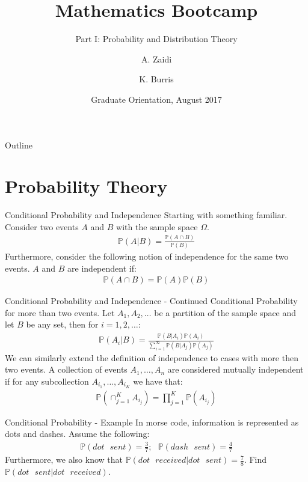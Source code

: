 \documentclass{beamer}
\title{Mathematics Bootcamp}
\subtitle{Part I: Probability and Distribution Theory}
\author{A. Zaidi\inst{1} \and K. Burris\inst{1}}
\institute[Duke University] %
{
  \inst{1}%
  Department of Statistical Science\\
  Duke University
  }
\date{Graduate Orientation, August 2017}
\begin{document}
\begin{frame}
  \titlepage
\end{frame}

\begin{frame}{Outline}
  \tableofcontents
\end{frame}

\section{Probability Theory}
\begin{frame}{Conditional Probability and Independence}
Starting with something familiar. Consider two events $A$ and $B$ with the sample space $\Omega$. 
\begin{align*}
\mathbb{P}(A|B) = \frac{\mathbb{P}(A \cap B)}{\mathbb{P}(B)}
\end{align*}
Furthermore, consider the following notion of independence for the same two events. $A$ and $B$ are independent if:
\begin{align*}
\mathbb{P}(A \cap B) = \mathbb{P}(A)\mathbb{P}(B)
\end{align*}
\end{frame}

\begin{frame}{Conditional Probability and Independence - Continued}
Conditional Probability for more than two events. Let $A_{1}, A_{2},\ldots$ be a partition of the sample space and let $B$ be any set, then for $i = 1, 2, \ldots$:
\begin{align*}
\mathbb{P}(A_{i}|B) = \frac{\mathbb{P}(B|A_{i})\mathbb{P}(A_{i})}{\sum_{i=1}^{\infty}\mathbb{P}(B|A_{j})\mathbb{P}(A_{j})}
\end{align*}
We can similarly extend the definition of independence to cases with more then two events. A collection of events $A_{1}, \ldots, A_{n}$ are considered mutually independent if for any subcollection $A_{i_{1}},\ldots,A_{i_{K}}$ we have that:
\begin{align*}
\mathbb{P}(\cap_{j = 1}^{K}A_{i_{j}}) = \prod_{j=1}^{K}\mathbb{P}(A_{i_{j}})
\end{align*}
\end{frame}

\begin{frame}{Conditional Probability - Example}
In morse code, information is represented as dots and dashes. Assume the following:
\begin{align*}
\mathbb{P}(dot\>\>\> sent) = \frac{3}{7} ;\>\>\>
\mathbb{P}(dash \>\>\> sent) = \frac{4}{7}
\end{align*}
Furthermore, we also know that $\mathbb{P}(dot\>\>\> received | dot \>\>\> sent) = \frac{7}{8}$. Find $\mathbb{P}(dot\>\>\> sent| dot \>\>\> received)$. 
\end{frame}
\end{document}
